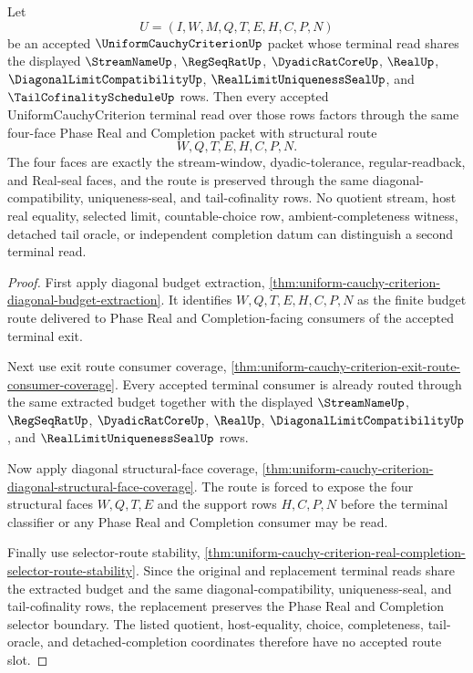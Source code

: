\begin{theorem}
\label{thm:uniform-cauchy-diagonal-uniqueness-four-face-terminal}
Let
$$
U=(I,W,M,Q,T,E,H,C,P,N)
$$
be an accepted $\UniformCauchyCriterionUp$ packet whose terminal read shares the displayed $\StreamNameUp$, $\RegSeqRatUp$, $\DyadicRatCoreUp$, $\RealUp$, $\DiagonalLimitCompatibilityUp$, $\RealLimitUniquenessSealUp$, and $\TailCofinalityScheduleUp$ rows. Then every accepted UniformCauchyCriterion terminal read over those rows factors through the same four-face Phase Real and Completion packet with structural route
$$
W,Q,T,E,H,C,P,N.
$$
The four faces are exactly the stream-window, dyadic-tolerance, regular-readback, and Real-seal faces, and the route is preserved through the same diagonal-compatibility, uniqueness-seal, and tail-cofinality rows. No quotient stream, host real equality, selected limit, countable-choice row, ambient-completeness witness, detached tail oracle, or independent completion datum can distinguish a second terminal read.
\end{theorem}
\begin{proof}
First apply diagonal budget extraction, \autoref{thm:uniform-cauchy-criterion-diagonal-budget-extraction}. It identifies $W,Q,T,E,H,C,P,N$ as the finite budget route delivered to Phase Real and Completion-facing consumers of the accepted terminal exit.

Next use exit route consumer coverage, \autoref{thm:uniform-cauchy-criterion-exit-route-consumer-coverage}. Every accepted terminal consumer is already routed through the same extracted budget together with the displayed $\StreamNameUp$, $\RegSeqRatUp$, $\DyadicRatCoreUp$, $\RealUp$, $\DiagonalLimitCompatibilityUp$, and $\RealLimitUniquenessSealUp$ rows.

Now apply diagonal structural-face coverage, \autoref{thm:uniform-cauchy-criterion-diagonal-structural-face-coverage}. The route is forced to expose the four structural faces $W,Q,T,E$ and the support rows $H,C,P,N$ before the terminal classifier or any Phase Real and Completion consumer may be read.

Finally use selector-route stability, \autoref{thm:uniform-cauchy-criterion-real-completion-selector-route-stability}. Since the original and replacement terminal reads share the extracted budget and the same diagonal-compatibility, uniqueness-seal, and tail-cofinality rows, the replacement preserves the Phase Real and Completion selector boundary. The listed quotient, host-equality, choice, completeness, tail-oracle, and detached-completion coordinates therefore have no accepted route slot.
\end{proof}

